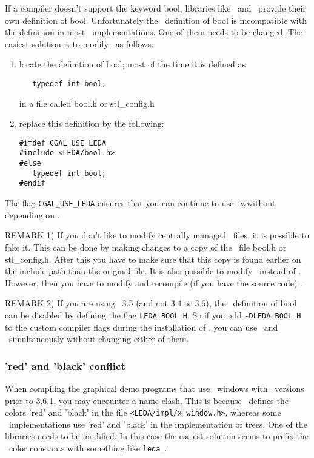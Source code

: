 If a compiler doesn't support the keyword bool, libraries like \leda\ 
and \stl\ provide their own definition of bool. Unfortunately the
\leda\ definition of bool is incompatible with the definition in most
\stl\ implementations. One of them needs to be changed. The easiest
solution is to modify \stl\ as follows:

\begin{enumerate}
\item locate the definition of bool; most of the time it is defined as

\begin{verbatim}
   typedef int bool;
\end{verbatim}

in a file called bool.h or stl\_config.h

\item replace this definition by the following:

\begin{verbatim}
#ifdef CGAL_USE_LEDA
#include <LEDA/bool.h>
#else
   typedef int bool;
#endif
\end{verbatim}
\end{enumerate}

The flag \texttt{CGAL\_USE\_LEDA} ensures that you can continue to use \stl\ wwithout
depending on \leda.

REMARK 1)
If you don't like to modify centrally managed \stl\ files, it is possible to fake
it. This can be done by making changes to a copy of the \stl\ file bool.h or
stl\_config.h. After this you have to make sure that this copy is found earlier
on the include path than the original file.
It is also possible to modify \leda\ instead of \stl. However, then
you have to modify and recompile (if you have the source code) \leda.

REMARK 2) If you are using \leda\ 3.5 (and not 3.4 or 3.6), the \leda\ 
definition of bool can be disabled by defining the flag
\texttt{LEDA\_BOOL\_H}. So if you add \texttt{-DLEDA\_BOOL\_H} to the
custom compiler flags during the installation of \cgal, you can use
\leda\ and \stl\ simultaneously without changing either of them.

\subsubsection{'red' and 'black' conflict}

When compiling the graphical demo programs that use \leda\ windows
with \leda\ versions prior to 3.6.1, you may encounter a name clash.
This is because \leda\ defines the colors 'red' and 'black' in the
file \texttt{<LEDA/impl/x\_window.h>}, whereas some \stl\ 
implementations use 'red' and 'black' in the implementation of trees.
One of the libraries needs to be modified. In this case the easiest
solution seems to prefix the \leda\ color constants with something
like \texttt{leda\_}.

